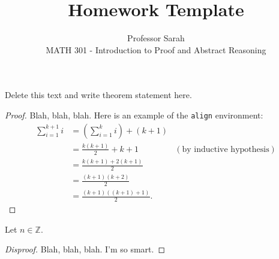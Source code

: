 \documentclass[12pt]{article}
\newcommand{\Z}{\mathbb{Z}}
\newenvironment{theorem}[2][Theorem]{\begin{trivlist}
\item[\hskip \labelsep {\bfseries #1}\hskip \labelsep {\bfseries #2.}]}{\end{trivlist}}
\newenvironment{proposition}[2][Proposition]{\begin{trivlist}
\item[\hskip \labelsep {\bfseries #1}\hskip \labelsep {\bfseries #2.}]}{\end{trivlist}}
\begin{document}
 
 
 
\title{Homework Template}%
\author{Professor Sarah\\ %
MATH 301 - Introduction to Proof and Abstract Reasoning} %
 
\maketitle
 
\begin{theorem}{x.yz} %
Delete this text and write theorem statement here.
\end{theorem}
 
\begin{proof}
Blah, blah, blah.  Here is an example of the \texttt{align} environment:
\begin{align*}
\sum_{i=1}^{k+1}i & = \left(\sum_{i=1}^{k}i\right) +(k+1)\\ 
& = \frac{k(k+1)}{2}+k+1 & (\text{by inductive hypothesis})\\
& = \frac{k(k+1)+2(k+1)}{2}\\
& = \frac{(k+1)(k+2)}{2}\\
& = \frac{(k+1)((k+1)+1)}{2}.
\end{align*}
\end{proof}
 
\begin{proposition}{x.yz}
Let $n\in \Z$.  
\end{proposition}
 
\begin{proof}[Disproof]%
Blah, blah, blah.  I'm so smart.
\end{proof}
 
 
\end{document}
